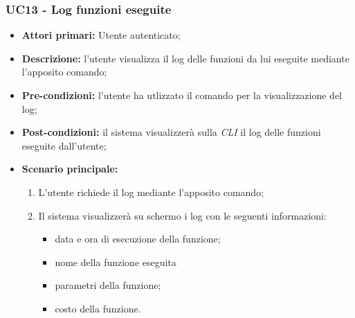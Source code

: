 \subsubsection{UC13 - Log funzioni eseguite}
\begin{itemize}
	\item \textbf{Attori primari:} Utente autenticato;
	\item \textbf{Descrizione:} l'utente visualizza il log delle funzioni da lui eseguite mediante l'apposito comando; 
	\item \textbf{Pre-condizioni:} l'utente ha utlizzato il comando per la visualizzazione del log;
	\item \textbf{Post-condizioni:} il sistema visualizzerà sulla \textit{CLI\glo} il log delle funzioni eseguite dall'utente;
	\item \textbf{Scenario principale:} 
	\begin{enumerate}
		\item L'utente richiede il log mediante l'apposito comando;
		\item Il sistema visualizzerà su schermo i log con le seguenti informazioni:
		\begin{itemize}
			\item data e ora di esecuzione della funzione;
			\item nome della funzione eseguita
			\item parametri della funzione;
			\item costo della funzione.
		\end{itemize}
	\end{enumerate}
\end{itemize}